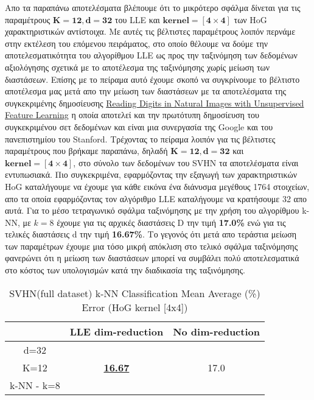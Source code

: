 \par
Απο τα παραπάνω αποτελέσματα βλέπουμε ότι το μικρότερο σφάλμα δίνεται για τις παραμέτρους $\mathbf{K=12, d=32}$ του \textlatin{LLE} και $\mathbf{kernel=[4 \times 4]}$ των \textlatin{HoG} χαρακτηριστικών αντίστοιχα. Με αυτές τις βέλτιστες παραμέτρους λοιπόν περνάμε στην εκτέλεση του επόμενου πειράματος, στο οποίο θέλουμε να δούμε την αποτελεσματικότητα του αλγορίθμου \textlatin{LLE} ως προς την ταξινόμηση των δεδομένων αξιολόγησης σχετικά με το αποτέλεσμα της ταξινόμησης χωρίς μείωση των διαστάσεων. Επίσης με το πείραμα αυτό έχουμε σκοπό να συγκρίνουμε το βέλτιστο αποτέλεσμα μας μετά απο την μείωση των διαστάσεων με τα αποτελέσματα της συγκεκριμένης δημοσίευσης \href{http://ufldl.stanford.edu/housenumbers/nips2011\textunderscore housenumbers.pdf}{\textlatin{Reading Digits in Natural Images
with Unsupervised Feature Learning}} \cite{12} η οποία αποτελεί και την πρωτότυπη δημοσίευση του συγκεκριμένου σετ δεδομένων και είναι μια συνεργασία της \textlatin{Google} και του πανεπιστημίου του \textlatin{Stanford}. Τρέχοντας το πείραμα λοιπόν για τις βέλτιστες παραμέτρους που βρήκαμε παραπάνω, δηλαδή $\mathbf{K=12, d=32}$ και $\mathbf{kernel=[4 \times 4]}$, στο σύνολο των δεδομένων του \textlatin{SVHN} τα αποτελέσματα είναι εντυπωσιακά. Πιο συγκεκριμένα, εφαρμόζοντας την εξαγωγή των χαρακτηριστικών \textlatin{HoG} καταλήγουμε να έχουμε για κάθε εικόνα ένα διάνυσμα μεγέθους 1764 στοιχείων, απο τα οποία εφαρμόζοντας τον αλγόριθμο \textlatin{LLE} καταλήγουμε να κρατήσουμε 32 απο αυτά. Για το μέσο τετραγωνικό σφάλμα ταξινόμησης με την χρήση του αλγορίθμου \textlatin{k-NN}, με $k=8$ έχουμε για τις αρχικές διαστάσεις \textlatin{D} την τιμή \textbf{17.0\%} ενώ για τις τελικές διαστάσεις \textlatin{d} την τιμή \textbf{16.67\%}. Το γεγονός ότι μετά απο τεράστια μείωση των παραμέτρων έχουμε μια τόσο μικρή απόκλιση στο τελικό σφάλμα ταξινόμησης φανερώνει ότι η μείωση των διαστάσεων μπορεί να συμβάλει πολύ αποτελεσματικά στο κόστος των υπολογισμών κατά την διαδικασία της ταξινόμησης.
\begin{table}[H]
\centering
\label{tab:table14}
\begin{tabular}{|c|c|c|}
\hline
 & LLE dim-reduction & No dim-reduction \\
\hline
d=32 & & \\
K=12 & \underline{\textbf{16.67}} & 17.0 \\
k-NN - k=8 & & \\
\hline
\end{tabular}
\caption{SVHN(full dataset) k-NN Classification Mean Average (\%) Error (HoG kernel [4x4])}
\end{table}

